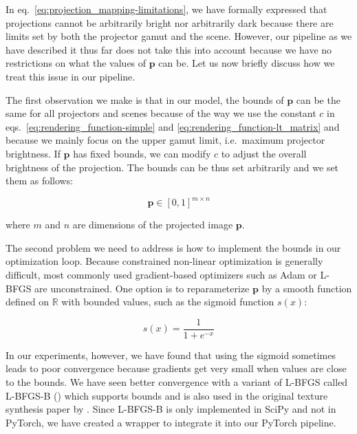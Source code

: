 In eq.~\ref{eq:projection_mapping-limitations}, we have formally expressed that projections cannot be arbitrarily bright nor arbitrarily dark because there are limits set by both the projector gamut and the scene. However, our pipeline as we have described it thus far does not take this into account because we have no restrictions on what the values of \(\bm{p}\) can be. Let us now briefly discuss how we treat this issue in our pipeline.

The first observation we make is that in our model, the bounds of \(\bm{p}\) can be the same for all projectors and scenes because of the way we use the constant \(c\) in eqs.~\ref{eq:rendering_function-simple} and \ref{eq:rendering_function-lt_matrix} and because we mainly focus on the upper gamut limit, i.e.~maximum projector brightness. If \(\bm{p}\) has fixed bounds, we can modify \(c\) to adjust the overall brightness of the projection. The bounds can be thus set arbitrarily and we set them as follows:

\begin{equation}
    \label{eq:optimization_restrictions}
    \bm{p} \in [0, 1]^{m \times n}
\end{equation}

where \(m\) and \(n\) are dimensions of the projected image \(\bm{p}\).

The second problem we need to address is how to implement the bounds in our optimization loop. Because constrained non-linear optimization is generally difficult, most commonly used gradient-based optimizers such as Adam or L-BFGS are unconstrained. One option is to reparameterize \(\bm{p}\) by a smooth function defined on \(\mathbb{R}\) with bounded values, such as the sigmoid function \(s(x)\):

\begin{equation}
    \label{eq:sigmoid}
    s(x) = \frac{1}{1 + e^{-x}}
\end{equation}

In our experiments, however, we have found that using the sigmoid sometimes leads to poor convergence because gradients get very small when values are close to the bounds. We have seen better convergence with a variant of L-BFGS called L-BFGS-B (\citet{Byrd1995}) which supports bounds and is also used in the original texture synthesis paper by \citet{Gatys2015}. Since L-BFGS-B is only implemented in SciPy and not in PyTorch, we have created a wrapper to integrate it into our PyTorch pipeline.